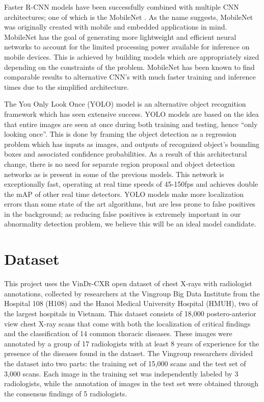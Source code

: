 \documentclass[conference]{IEEEtran}
\begin{document}
Faster R-CNN models have been successfully combined with multiple CNN architectures; one of which is the MobileNet \cite{howard2017mobilenets}. As the name suggests, MobileNet was originally created with mobile and embedded applications in mind. MobileNet has the goal of generating more lightweight and efficient neural networks to account for the limited processing power available for inference on mobile devices. This is achieved by building models which are appropriately sized depending on the constraints of the problem.  MobileNet has been known to find comparable results to alternative CNN’s with much faster training and inference times due to the simplified architecture.

The You Only Look Once (YOLO) \cite{redmon2016you} model is an alternative object recognition framework which has seen extensive success. YOLO models are based on the idea that entire images are seen at once during both training and testing, hence “only looking once”. This is done by framing the object detection as a regression problem which has inputs as images, and outputs of recognized object’s bounding boxes and associated confidence probabilities. As a result of this architectural change, there is no need for separate region proposal and object detection networks as is present in some of the previous models. This network is exceptionally fast, operating at real time speeds of 45-150fps and achieves double the mAP of other real time detectors. YOLO models make more localization errors than some state of the art algorithms, but are less prone to false positives in the background; as reducing false positives is extremely important in our abnormality detection problem, we believe this will be an ideal model candidate.

\section{Dataset} \label{dataset}
This project uses the VinDr-CXR open dataset \cite{nguyen2020vindr} of chest X-rays with radiologist annotations, collected by researchers at the Vingroup Big Data Institute from the Hospital 108 (H108) and the Hanoi Medical University Hospital (HMUH), two of the largest hospitals in Vietnam. This dataset consists of 18,000 postero-anterior view chest X-ray scans that come with both the localization of critical findings and the classification of 14 common thoracic diseases. These images were annotated by a group of 17 radiologists with at least 8 years of experience for the presence of the diseases found in the dataset. The Vingroup researchers divided the dataset into two parts: the training set of 15,000 scans and the test set of 3,000 scans. Each image in the training set was independently labeled by 3 radiologists, while the annotation of images in the test set were obtained through the consensus findings of 5 radiologists. 
\end{document}
